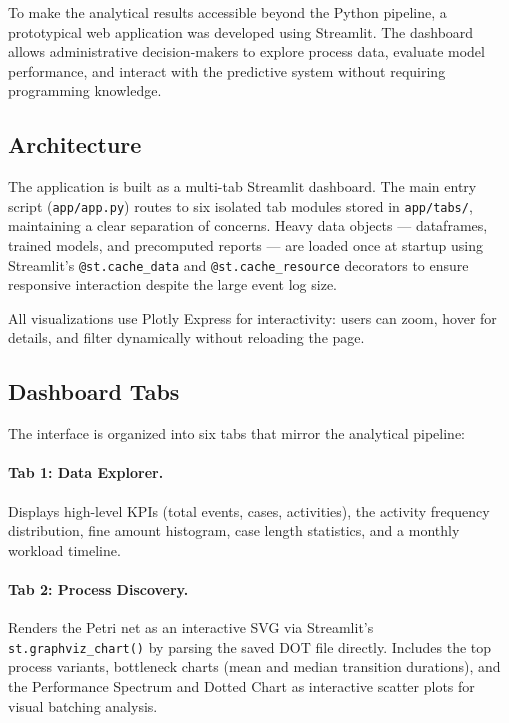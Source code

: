 
To make the analytical results accessible beyond the Python pipeline, a prototypical web application was developed using Streamlit. The dashboard allows administrative decision-makers to explore process data, evaluate model performance, and interact with the predictive system without requiring programming knowledge.

\subsection{Architecture}
\label{sub:architecture}

The application is built as a multi-tab Streamlit dashboard. The main entry script (\texttt{app/app.py}) routes to six isolated tab modules stored in \texttt{app/tabs/}, maintaining a clear separation of concerns. Heavy data objects — dataframes, trained models, and precomputed reports — are loaded once at startup using Streamlit's \texttt{@st.cache\_data} and \texttt{@st.cache\_resource} decorators to ensure responsive interaction despite the large event log size.

All visualizations use Plotly Express for interactivity: users can zoom, hover for details, and filter dynamically without reloading the page.

\subsection{Dashboard Tabs}
\label{sub:functionalities}

The interface is organized into six tabs that mirror the analytical pipeline:

\paragraph{Tab 1: Data Explorer.}
Displays high-level KPIs (total events, cases, activities), the activity frequency distribution, fine amount histogram, case length statistics, and a monthly workload timeline.

\paragraph{Tab 2: Process Discovery.}
Renders the Petri net as an interactive SVG via Streamlit's \texttt{st.graphviz\_chart()} by parsing the saved DOT file directly. Includes the top process variants, bottleneck charts (mean and median transition durations), and the Performance Spectrum and Dotted Chart as interactive scatter plots for visual batching analysis.

